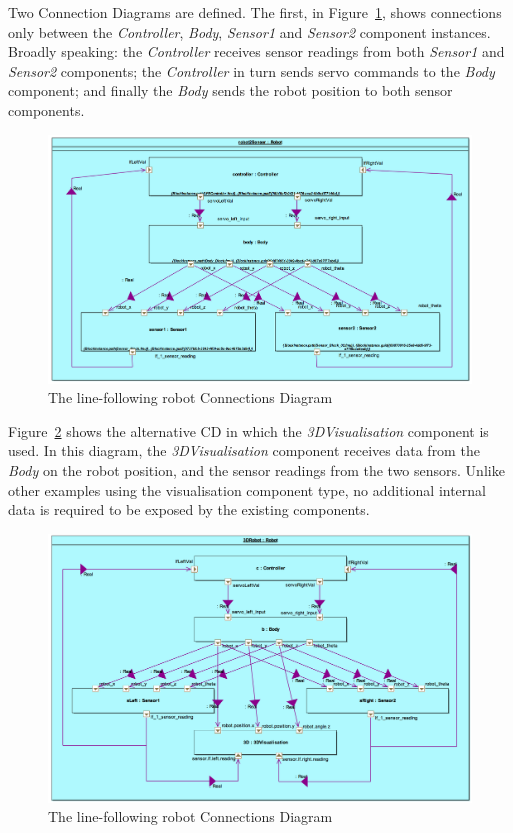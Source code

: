Two Connection Diagrams are defined. The first, in Figure~\ref{fig:linefollowcd1}, shows connections only between the \emph{Controller}, \emph{Body}, \emph{Sensor1} and \emph{Sensor2} component instances. Broadly speaking: the \emph{Controller} receives sensor readings from both \emph{Sensor1} and \emph{Sensor2} components; the \emph{Controller} in turn sends servo commands to the \emph{Body} component; and finally the \emph{Body} sends the robot position to both sensor components. 

\begin{figure}[htb!]
\begin{center}
     \includegraphics[width=0.9\linewidth]{linefollower/r2g2p_cd_non3d.png} 
\caption{The line-following robot Connections Diagram}
\label{fig:linefollowcd1}
\end{center}
\end{figure}

Figure~\ref{fig:linefollowcd2} shows the alternative CD in which the \emph{3DVisualisation} component is used. In this diagram, the \emph{3DVisualisation} component receives data from the \emph{Body} on the robot position, and the sensor readings from the two sensors. Unlike other examples using the visualisation component type, no additional internal data is required to be exposed by the existing components. 

\begin{figure}[htb!]
\begin{center}
     \includegraphics[width=0.9\linewidth]{linefollower/r2g2p_cd_nonrep_3d.png} 
\caption{The line-following robot Connections Diagram}
\label{fig:linefollowcd2}
\end{center}
\end{figure}

